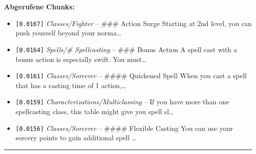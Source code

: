 \noindent\textbf{Abgerufene Chunks:}
\begin{itemize}[noitemsep, topsep=2pt]
  \item[\textbf{\#1}] \texttt{[0.0167]} \textit{Classes/Fighter} -- \#\#\# Action Surge  Starting at 2nd level, you can push yourself beyond your norma\ldots
  \item[\textbf{\#2}] \texttt{[0.0164]} \textit{Spells/# Spellcasting} -- \#\#\# Bonus Action  A spell cast with a bonus action is especially swift. You must\ldots
  \item[\textbf{\#3}] \texttt{[0.0161]} \textit{Classes/Sorcerer} -- \#\#\#\# Quickened Spell  When you cast a spell that has a casting time of 1 action,\ldots
  \item[\textbf{\#4}] \texttt{[0.0159]} \textit{Characterizations/Multiclassing} -- If you have more than one spellcasting class, this table might give you spell sl\ldots
  \item[\textbf{\#5}] \texttt{[0.0156]} \textit{Classes/Sorcerer} -- \#\#\#\# Flexible Casting  You can use your sorcery points to gain additional spell \ldots
\end{itemize}
\vspace{4pt}
\hrule
\vspace{6pt}
